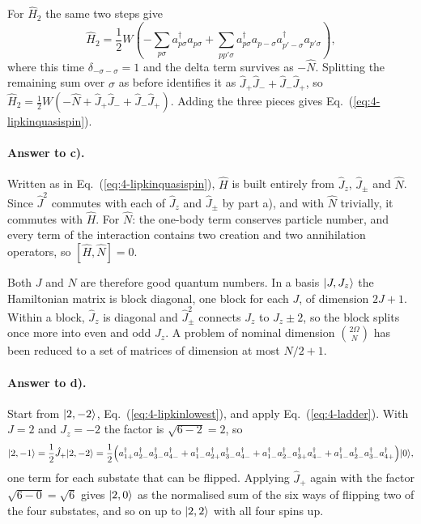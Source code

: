 For $\hat{H}_2$ the same two steps give
\begin{equation}
  \hat{H}_2 = \frac{1}{2}W\left(
    -\sum_{p\sigma}a_{p\sigma}^{\dagger}a_{p\sigma}
    + \sum_{pp'\sigma}a_{p\sigma}^{\dagger}a_{p-\sigma}
      a_{p'-\sigma}^{\dagger}a_{p'\sigma}\right),
  \label{eq:4-exb3}
\end{equation}
where this time $\delta_{-\sigma-\sigma}=1$ and the delta term survives as
$-\hat{N}$.  Splitting the remaining sum over $\sigma$ as before identifies it
as $\hat{J}_+\hat{J}_-+\hat{J}_-\hat{J}_+$, so
$\hat{H}_2=\tfrac12 W(-\hat{N}+\hat{J}_+\hat{J}_-+\hat{J}_-\hat{J}_+)$.
Adding the three pieces gives Eq.~(\ref{eq:4-lipkinquasispin}).

\paragraph{Answer to c).}
Written as in Eq.~(\ref{eq:4-lipkinquasispin}), $\hat{H}$ is built entirely
from $\hat{J}_z$, $\hat{J}_{\pm}$ and $\hat{N}$.  Since $\hat{J}^2$ commutes
with each of $\hat{J}_z$ and $\hat{J}_{\pm}$ by part a), and with $\hat{N}$
trivially, it commutes with $\hat{H}$.  For $\hat{N}$: the one-body term
conserves particle number, and every term of the interaction contains two
creation and two annihilation operators, so $[\hat{H},\hat{N}]=0$.

Both $J$ and $N$ are therefore good quantum numbers.  In a basis
$\vert J,J_z \rangle$ the Hamiltonian matrix is block diagonal, one block for each
$J$, of dimension $2J+1$.  Within a block, $\hat{J}_z$ is diagonal and
$\hat{J}_{\pm}^2$ connects $J_z$ to $J_z\pm2$, so the block splits once more
into even and odd $J_z$.  A problem of nominal dimension
$\binom{2\Omega}{N}$ has been reduced to a set of matrices of dimension at
most $N/2+1$.

\paragraph{Answer to d).}
Start from $\vert 2,-2 \rangle$, Eq.~(\ref{eq:4-lipkinlowest}), and apply
Eq.~(\ref{eq:4-ladder}).  With $J=2$ and $J_z=-2$ the factor is
$\sqrt{6-2}=2$, so
\begin{equation}
  \vert 2,-1 \rangle = \frac{1}{2}\hat{J}_+\vert 2,-2 \rangle
   = \frac{1}{2}\Big(
     a_{1+}^{\dagger}a_{2-}^{\dagger}a_{3-}^{\dagger}a_{4-}^{\dagger}
   + a_{1-}^{\dagger}a_{2+}^{\dagger}a_{3-}^{\dagger}a_{4-}^{\dagger}
   + a_{1-}^{\dagger}a_{2-}^{\dagger}a_{3+}^{\dagger}a_{4-}^{\dagger}
   + a_{1-}^{\dagger}a_{2-}^{\dagger}a_{3-}^{\dagger}a_{4+}^{\dagger}
     \Big)\vert 0 \rangle,
  \label{eq:4-exd1}
\end{equation}
one term for each substate that can be flipped.  Applying $\hat{J}_+$ again
with the factor $\sqrt{6-0}=\sqrt6$ gives $\vert 2,0 \rangle$ as the normalised sum
of the six ways of flipping two of the four substates, and so on up to
$\vert 2,2 \rangle$ with all four spins up.

